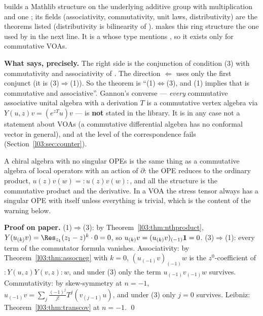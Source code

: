 \begin{dictionary}
\textbf{} builds a Mathlib  structure on the underlying additive
group with multiplication  and one ; its fields (associativity, commutativity,
unit laws, distributivity) are the theorems listed (distributivity is bilinearity of ).
 makes this ring structure the one used by \lean{*} in the next line. It is a
 whose type mentions , so it exists only for commutative VOAs.

\textbf{What  says, precisely.} The right side is the conjunction of
condition (3) with commutativity and associativity of . The direction $\Leftarrow$ uses only
the first conjunct (it is (3)$\Rightarrow$(1)). So the theorem is ``(1)$\iff$(3), and (1) implies that
 is commutative and associative''. Gannon's converse --- \emph{every} commutative
associative unital algebra with a derivation $T$ is a commutative vertex algebra via
$Y(u,z)v = (e^{zT}u)v$ --- is \textbf{not} stated in the library. It is in any case not a statement
about VOAs (a commutative differential algebra has no conformal vector in general), and at the level
of  the correspondence fails (Section~\ref{l03:sec:counter}).
\end{dictionary}

\begin{physics}
A chiral algebra with no singular OPEs is the same thing as a commutative algebra of local operators
with an action of $\partial$: the OPE reduces to the ordinary product, $u(z)v(w) = {:}u(z)v(w){:}$, and
all the structure is the commutative product and the derivative. In a VOA the stress tensor always
has a singular OPE with itself unless everything is trivial, which is the content of the warning
below.
\end{physics}

\textbf{Proof on paper.} (1)$\Rightarrow$(3): by Theorem~\ref{l03:thm:nthproduct},
$Y(u_{(k)}v) = \Res_{z_1}(z_1-z)^k\cdot0 = 0$, so $u_{(k)}v = (u_{(k)}v)_{(-1)}\mathbf{1} = 0$.
(3)$\Rightarrow$(1): every term of the commutator formula vanishes. Associativity: by
Theorem~\ref{l03:thm:assocneg} with $k = 0$, $(u_{(-1)}v)_{(-1)}w$ is the $z^0$-coefficient of
${:}Y(u,z)Y(v,z){:}w$, and under (3) only the term $u_{(-1)}v_{(-1)}w$ survives. Commutativity: by
skew-symmetry at $n=-1$, $u_{(-1)}v = \sum_j\frac{(-1)^j}{j!}T^j(v_{(j-1)}u)$, and under (3) only $j = 0$
survives. Leibniz: Theorem~\ref{l03:thm:transcov} at $n = -1$. \qed

